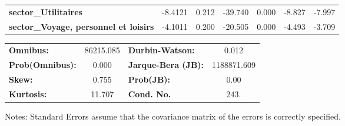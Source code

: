 \begin{center}
\begin{tabular}{lcccccc}
\textbf{sector\_Utilitaires}                                          &      -8.4121  &        0.212     &   -39.740  &         0.000        &       -8.827    &       -7.997     \\
\textbf{sector\_Voyage, personnel et loisirs}                         &      -4.1011  &        0.200     &   -20.505  &         0.000        &       -4.493    &       -3.709     \\
\bottomrule
\end{tabular}
\begin{tabular}{lclc}
\textbf{Omnibus:}       & 86215.085 & \textbf{  Durbin-Watson:     } &      0.012   \\
\textbf{Prob(Omnibus):} &    0.000  & \textbf{  Jarque-Bera (JB):  } & 1188871.609  \\
\textbf{Skew:}          &    0.755  & \textbf{  Prob(JB):          } &       0.00   \\
\textbf{Kurtosis:}      &   11.707  & \textbf{  Cond. No.          } &       243.   \\
\bottomrule
\end{tabular}
\end{center}

Notes: \newline
 [1] Standard Errors assume that the covariance matrix of the errors is correctly specified.
